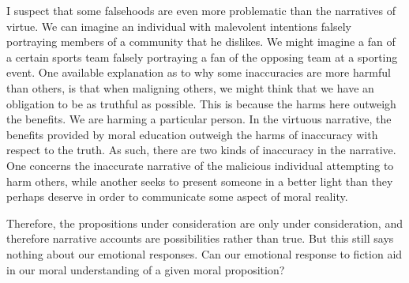 \documentclass[phdthesis,12pt,final]{wuthesis}
\theoremstyle{definition}
\theoremstyle{definition}
\theoremstyle{definition}
\theoremstyle{definition}
\theoremstyle{remark}
\begin{document}
I suspect that some falsehoods are even more problematic than the narratives of virtue. We can imagine an individual with malevolent intentions falsely portraying members of a community that he dislikes. We might imagine a fan of a certain sports team falsely portraying a fan of the opposing team at a sporting event. One available explanation as to why some inaccuracies are more harmful than others, is that when maligning others, we might think that we have an obligation to be as truthful as possible. This is because the harms here outweigh the benefits. We are harming a particular person. In the virtuous narrative, the benefits provided by moral education outweigh the harms of inaccuracy with respect to the truth. As such, there are two kinds of inaccuracy in the narrative. One concerns the inaccurate narrative of the malicious individual attempting to harm others, while another seeks to present someone in a better light than they perhaps deserve in order to communicate some aspect of moral reality.

Therefore, the propositions under consideration are only under consideration, and therefore narrative accounts are possibilities rather than true. But this still says nothing about our emotional responses. Can our emotional response to fiction aid in our moral understanding of a given moral proposition?
\end{document}
